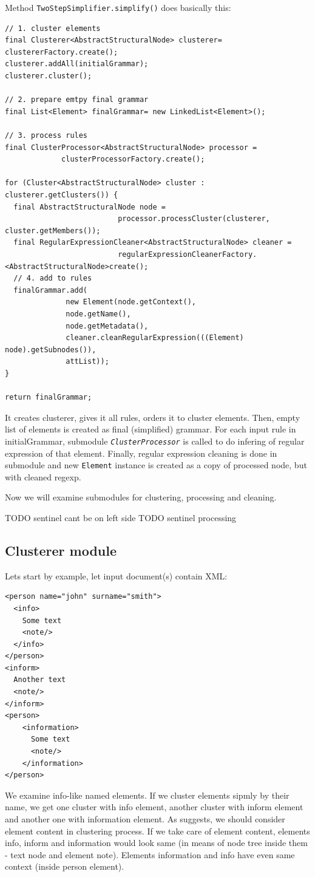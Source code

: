 \documentclass[a4paper,10pt,oneside]{article}
\newcommand{\code}[1]{\texttt{#1}}
\newcommand{\jmodule}[1]{\texttt{\textit{#1}}}
\begin{document}
Method \code{TwoStepSimplifier.simplify()} does basically this:
\begin{verbatim}
// 1. cluster elements
final Clusterer<AbstractStructuralNode> clusterer= clustererFactory.create();
clusterer.addAll(initialGrammar);
clusterer.cluster();

// 2. prepare emtpy final grammar
final List<Element> finalGrammar= new LinkedList<Element>();

// 3. process rules
final ClusterProcessor<AbstractStructuralNode> processor =
             clusterProcessorFactory.create();
             
for (Cluster<AbstractStructuralNode> cluster : clusterer.getClusters()) {
  final AbstractStructuralNode node =  
                          processor.processCluster(clusterer, cluster.getMembers());
  final RegularExpressionCleaner<AbstractStructuralNode> cleaner = 
                          regularExpressionCleanerFactory.<AbstractStructuralNode>create();
  // 4. add to rules
  finalGrammar.add(
              new Element(node.getContext(),
              node.getName(),
              node.getMetadata(),
              cleaner.cleanRegularExpression(((Element) node).getSubnodes()),
              attList));
}

return finalGrammar;
\end{verbatim}
It creates clusterer, gives it all rules, orders it to cluster elements.
Then, empty list of elements is created as final (simplified) grammar.
For each input rule in initialGrammar, submodule \jmodule{ClusterProcessor} is called to do infering of regular expression of that element.
Finally, regular expression cleaning is done in submodule and new \code{Element} instance is created as a copy of processed node, but with cleaned regexp.

Now we will examine submodules for clustering, processing and cleaning.

TODO sentinel cant be on left side
TODO sentinel processing

\subsection{Clusterer module}
Lets start by example, let input document(s) contain XML:
\begin{verbatim}
<person name="john" surname="smith">
  <info>
    Some text
    <note/>
  </info>
</person>
<inform>
  Another text
  <note/>
</inform>
<person>
    <information>
      Some text
      <note/>
    </information>
</person>
\end{verbatim}
We examine info-like named elements.
If we cluster elements sipmly by their name, we get one cluster with info element, another cluster with inform element and another one with information element.
As \cite{1802522} suggests, we should consider element content in clustering process.
If we take care of element content, elements info, inform and information would look same (in means of node tree inside them - text node and element note).
Elements information and info have even same context (inside person element).
\end{document}
